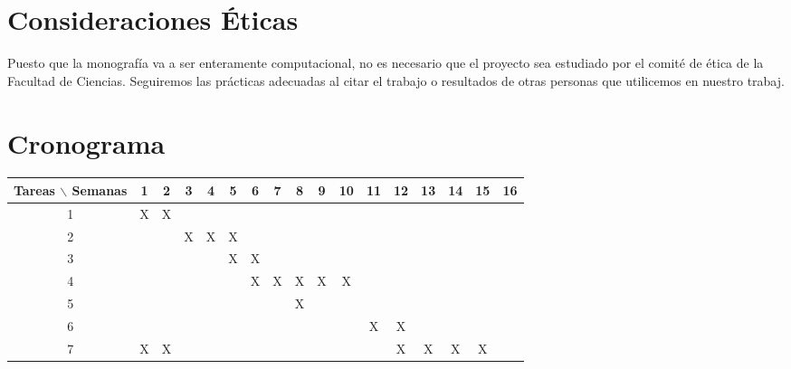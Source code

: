 \documentclass[12pt]{article}
\begin{document}
\section{Consideraciones \'Eticas}

Puesto que la monografía va a ser enteramente computacional, no es
necesario que el proyecto sea estudiado por el comité de ética de la
Facultad de Ciencias. 
Seguiremos las pr\'acticas adecuadas al citar el trabajo o resultados
de otras personas que utilicemos en nuestro trabaj. 



\section{Cronograma}

\begin{table}[htb]
	\begin{tabular}{|c|cccccccccccccccc| }
	\hline
	Tareas $\backslash$ Semanas & 1 & 2 & 3 & 4 & 5 & 6 & 7 & 8 & 9 & 10 & 11 & 12 & 13 & 14 & 15 & 16  \\
	\hline
	1 & X & X &   &    &   &   &   &   &   &   &   &   &   &   &   &   \\
	2 &   &   & X &  X & X &   &   &   &   &   &   &   &   &   &   &   \\
	3 &   &   &   &    & X &  X &  &  &   &   &   &   &   &   &   &   \\
	4 &   &   &   &    &   &   X & X & X & X & X &   &   &   &   &   &   \\
    5 &   &   &   &    &   &     &   & X &   &   &   &   &   &   &   &   \\
	6 &   &   &   &   &  &   &   &   &  &   &  X & X &   &   &  &   \\
    7 & X  &  X &   &   &  &   &   &   &   &   &   &  X&  X &  X &  X&   \\
	\hline
	\end{tabular}
\end{table}
\vspace{1mm}
\end{document}
